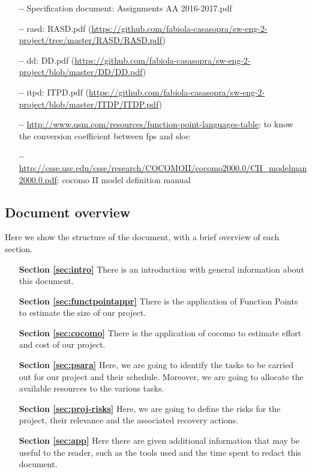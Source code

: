 \begin{itemize}
\item[\textbf{--}] Specification document: Assignments AA 2016-2017.pdf
\item[\textbf{--}] \acl{rasd}: RASD.pdf 
\newline
(\url{https://github.com/fabiola-casasopra/sw-eng-2-project/tree/master/RASD/RASD.pdf})
\item[\textbf{--}] \acl{dd}: DD.pdf 
\newline
(\url{https://github.com/fabiola-casasopra/sw-eng-2-project/blob/master/DD/DD.pdf})
\item[\textbf{--}] \acl{itpd}: ITPD.pdf 
\newline
(\url{https://github.com/fabiola-casasopra/sw-eng-2-project/blob/master/ITDP/ITDP.pdf})
\item[\textbf{--}] \url{http://www.qsm.com/resources/function-point-languages-table}: to know the conversion coefficient between \acs{fp}s and \acs{sloc}
\item[\textbf{--}] \url {http://csse.usc.edu/csse/research/COCOMOII/cocomo2000.0/CII_modelman2000.0.pdf}: \acs{cocomo} II model definition manual
\end{itemize}

\subsection{Document overview}

Here we show the structure of the document, with a brief overview of each section.

\begin{itemize}

\item[\textbf{Section \ref{sec:intro}}]There is an introduction with general information about this document.

\item[\textbf{Section \ref{sec:functpointappr}}]There is the application of Function Points to estimate the size of our project.  

\item[\textbf{Section \ref{sec:cocomo}}]There is the application of \acs{cocomo} to estimate effort and cost of our project.

\item[\textbf{Section \ref{sec:psara}}]Here, we are going to identify the tasks to be carried out for our project and their schedule. Moreover, we are going to allocate the available resources to the various tasks.

\item[\textbf{Section \ref{sec:proj-risks}}]Here, we are going to define the risks for the project, their relevance and the associated recovery actions.

\item[\textbf{Section \ref{sec:app}}]Here there are given additional information that may be useful to the reader, such as the tools used and the time spent to redact this document.
\end{itemize}
